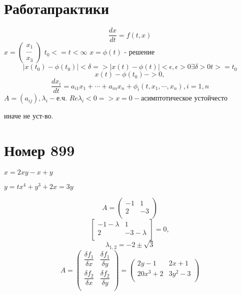 \section*{Работапрактики}
$$ \dfrac{dx}{dt} = f(t, x) $$
$ x = \begin{pmatrix} x_1 \\ \cdots \\ x_3 \end{pmatrix} $
$ t_0 <= t < \infty $
$ x = \phi(t) $ - решение
$$ |x(t_0) - \phi(t_0)| < \delta => |x(t) - \phi(t)| < \epsilon, \epsilon > 0 \exists \delta > 0 t >= t_0 $$
$$ x(t) - \phi(t_0) -> 0, \text{} $$
$$ \dfrac{dx_i}{dt} = a_{i1} x_1 + \cdots + a_{in} x_n + \phi_i(t, x_1, \cdots, x_n), i = 1, n $$
$ A = (a_{ij}), \lambda_i - \text{е.ч.} $
$ Re \lambda_i < 0 => x = 0 - \text{асимптотическое устойчесто} $ \par
иначе не уст-во.

\section*{Номер 899}
    $x = 2xy - x + y$\par
    $y = tx^4 + y^3 + 2x = 3y$
\begin{solution}
    $$ A = \begin{pmatrix} -1 & 1 \\ 2 & -3 \\ \end{pmatrix} $$
    $$ \begin{bmatrix}
        -1 - \lambda & 1 \\
        2 & -3 -\lambda \\
    \end{bmatrix} = 0, $$
    $$ \lambda_{1,2} = -2\pm\sqrt{3} $$
    $$ A = \begin{pmatrix}
        \dfrac{\delta f_1}{\delta x} & \dfrac{\delta f_1}{\delta y} \\
        \dfrac{\delta f_2}{\delta x} & \dfrac{\delta f_2}{\delta y} \\
    \end{pmatrix} = 
    \begin{pmatrix}
        2y - 1 & 2x + 1 \\
        20x^3 + 2 & 3y^2 - 3 \\
    \end{pmatrix} $$


\end{solution}

